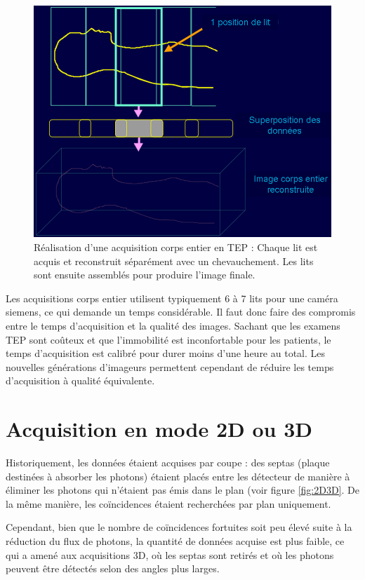 \begin{figure}
\centering
\includegraphics[width=12cm]{images/multilits}
\caption[Acquisitions corps entier en TEP]{Réalisation d'une acquisition corps entier en TEP : Chaque lit est acquis et reconstruit séparément avec un chevauchement. Les lits sont ensuite assemblés pour produire l'image finale.}
\label{fig:multilits}
\end{figure}

Les acquisitions corps entier utilisent typiquement 6 à 7 lits pour une caméra siemens, ce qui demande un temps considérable. Il faut donc faire des compromis entre le temps d'acquisition et la qualité des images. Sachant que les examens TEP sont coûteux et que l'immobilité est inconfortable pour les patients, le temps d'acquisition est calibré pour durer moins d'une heure au total. Les nouvelles générations d'imageurs permettent cependant de réduire les temps d'acquisition à qualité équivalente.

	\section{Acquisition en mode 2D ou 3D}

Historiquement, les données étaient acquises par coupe : des septas (plaque destinées à absorber les photons) étaient placés entre les détecteur de manière à éliminer les photons qui n'étaient pas émis dans le plan (voir figure \ref{fig:2D3D}. De la même manière, les coïncidences étaient recherchées par plan uniquement.

Cependant, bien que le nombre de coïncidences fortuites soit peu élevé suite à la réduction du flux de photons, la quantité de données acquise est plus faible, ce qui a amené aux acquisitions 3D, où les septas sont retirés et où les photons peuvent être détectés selon des angles plus larges.


